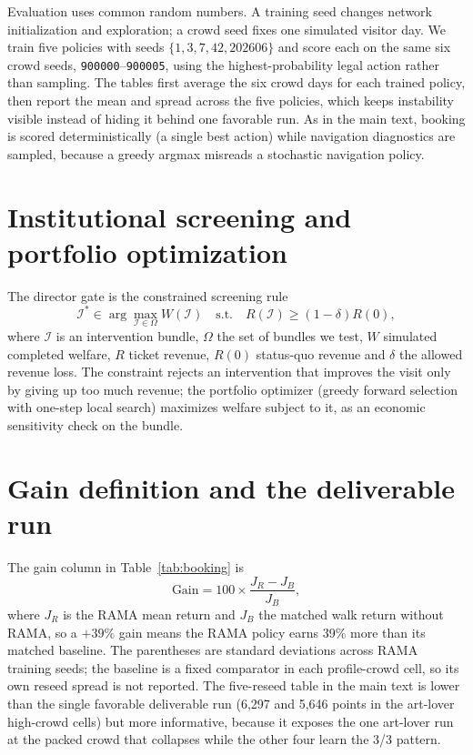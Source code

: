 \documentclass[11pt]{article}
\numberwithin{equation}{section} %
\newcommand{\code}[1]{\texttt{\small #1}}
\begin{document}
Evaluation uses common random numbers. A training seed changes network initialization and exploration; a crowd
seed fixes one simulated visitor day. We train five policies with seeds $\{1,3,7,42,202606\}$ and score each
on the same six crowd seeds, \code{900000}--\code{900005}, using the highest-probability legal action rather
than sampling. The tables first average the six crowd days for each trained policy, then report the mean and
spread across the five policies, which keeps instability visible instead of hiding it behind one favorable run.
As in the main text, booking is scored deterministically (a single best action) while navigation diagnostics
are sampled, because a greedy argmax misreads a stochastic navigation policy.

\section{Institutional screening and portfolio optimization}
\label{app:gate}

The director gate is the constrained screening rule
\begin{equation}
\mathcal I^*\in\arg\max_{\mathcal I\in\Omega} W(\mathcal I)
\quad\text{s.t.}\quad R(\mathcal I)\ge (1-\delta)R(0),
\label{eq:gate}
\end{equation}
where $\mathcal I$ is an intervention bundle, $\Omega$ the set of bundles we test, $W$ simulated completed
welfare, $R$ ticket revenue, $R(0)$ status-quo revenue and $\delta$ the allowed revenue loss. The constraint
rejects an intervention that improves the visit only by giving up too much revenue; the portfolio optimizer
(greedy forward selection with one-step local search) maximizes welfare subject to it, as an economic
sensitivity check on the bundle.

\section{Gain definition and the deliverable run}
\label{app:results}

The gain column in Table~\ref{tab:booking} is
\begin{equation}
\text{Gain}=100\times\frac{J_{R}-J_{B}}{J_{B}},
\label{eq:gain}
\end{equation}
where $J_R$ is the RAMA mean return and $J_B$ the matched walk return without RAMA, so a $+39\%$ gain means the
RAMA policy earns 39\% more than its matched baseline. The parentheses are standard deviations across RAMA
training seeds; the baseline is a fixed comparator in each profile-crowd cell, so its own reseed spread is not
reported. The five-reseed table in the main text is lower than the single favorable deliverable run (6,297 and
5,646 points in the art-lover high-crowd cells) but more informative, because it exposes the one art-lover run
at the packed crowd that collapses while the other four learn the 3/3 pattern.
\end{document}
